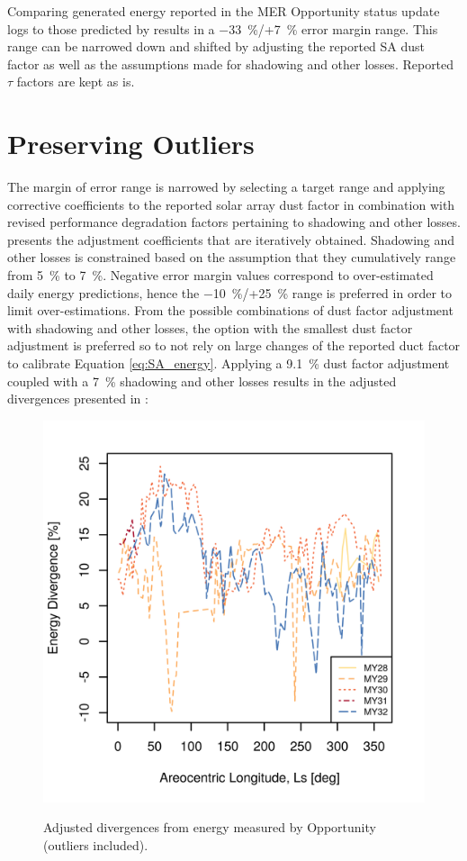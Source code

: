 Comparing generated energy reported in the \ac{MER} Opportunity status update logs to those predicted by  results in a \SI{-33}{\percent}/+\SI{7}{\percent} error margin range. This range can be narrowed down and shifted by adjusting the reported \ac{SA} dust factor as well as the assumptions made for shadowing and other losses. Reported $\tau$ factors are kept as is.

\section{Preserving Outliers}
\label{sec:Appendix:NarrowedEnergyPredictionErrorMarginRange:PreservingOutliers}

The margin of error range is narrowed by selecting a target range and applying corrective coefficients to the reported solar array dust factor in combination with revised performance degradation factors pertaining to shadowing and other losses.  presents the adjustment coefficients that are iteratively obtained. Shadowing and other losses is constrained based on the assumption that they cumulatively range from \SI{5}{\percent} to \SI{7}{\percent}. Negative error margin values correspond to over-estimated daily energy predictions, hence the \SI{-10}{\percent}/+\SI{25}{\percent} range is preferred in order to limit over-estimations. From the possible combinations of dust factor adjustment with shadowing and other losses, the option with the smallest dust factor adjustment is preferred so to not rely on large changes of the reported duct factor to calibrate Equation \ref{eq:SA_energy}. Applying a \SI{9.1}{\percent} dust factor adjustment coupled with a \SI{7}{\percent} shadowing and other losses results in the adjusted divergences presented in :

\begin{figure}[h]
  \centering
  \hypersetup{linkcolor=captionTextColor}
  \includegraphics[width=0.5\linewidth]{sections/appendix/energy-error-margin/plots/energy-prediction-divergences-from-my28-to-my32-adjusted.png}\\
  \caption[Adjusted divergences from energy measured by Opportunity (outliers included)]
          {Adjusted divergences from energy measured by Opportunity (outliers included).}
  \label{fig:plot:mer-energy-prediction-divergences-adjusted}
\end{figure}


